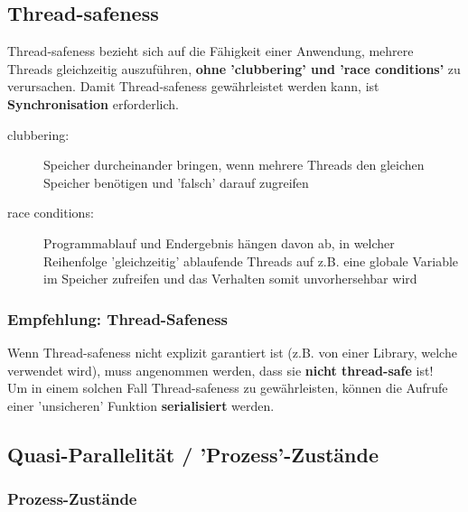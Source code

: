 \subsection{Thread-safeness}
Thread-safeness bezieht sich auf die Fähigkeit einer Anwendung, mehrere Threads gleichzeitig auszuführen,
\textbf{ohne 'clubbering' und 'race conditions'} zu verursachen. Damit Thread-safeness gewährleistet werden kann, ist \textbf{Synchronisation}
erforderlich.

\begin{description}
    \item[clubbering:] Speicher durcheinander bringen, wenn mehrere Threads den gleichen Speicher benötigen und 'falsch' darauf zugreifen
    \item[race conditions:] Programmablauf und Endergebnis hängen davon ab, in welcher Reihenfolge 'gleichzeitig' ablaufende Threads auf z.B. eine
        globale Variable im Speicher zufreifen und das Verhalten somit unvorhersehbar wird
\end{description}


\subsubsection{Empfehlung: Thread-Safeness}

Wenn Thread-safeness nicht explizit garantiert ist (z.B. von einer Library, welche verwendet wird), muss  angenommen werden, dass sie 
\textbf{nicht thread-safe} ist! \\
Um in einem solchen Fall Thread-safeness zu gewährleisten, können die Aufrufe einer 'unsicheren' Funktion \textbf{serialisiert} werden.


\subsection{Quasi-Parallelität / 'Prozess'-Zustände}

\subsubsection{Prozess-Zustände}

